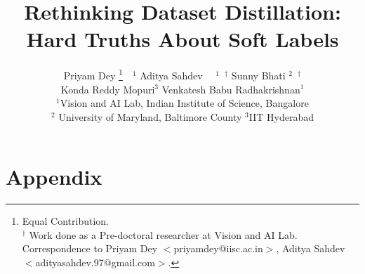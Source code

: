 \documentclass[10pt,twocolumn,letterpaper]{article}
\title{Rethinking Dataset Distillation: Hard Truths About Soft Labels}
\author{Priyam Dey \thanks{Equal Contribution.\\ $^\dag$ Work done as a Pre-doctoral researcher at Vision and AI Lab.\\ Correspondence to Priyam Dey $<$priyamdey@iisc.ac.in$>$, Aditya Sahdev $<$adityasahdev.97@gmail.com$>$.}~~$^{1}$ \quad Aditya Sahdev \footnotemark[1]~~$^{1}$~$^\dag$ \quad Sunny Bhati $^{2}$~$^\dag$ \\ \quad Konda Reddy Mopuri$^{3}$ \quad Venkatesh Babu Radhakrishnan$^{1}$ \vspace{0.3em} \\
{\normalsize $^1$Vision and AI Lab, Indian Institute of Science, Bangalore} \\ \quad
\normalsize $^2$ University of Maryland, Baltimore County \quad
{\normalsize $^3$IIT Hyderabad} \quad \\
}
\begin{document}
\maketitle
    


% 




{
    \small
    
    
}

\clearpage
\newpage
\appendix
\section*{Appendix}


% 
\end{document}
